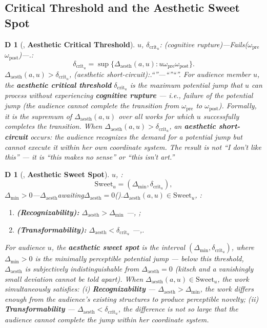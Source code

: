 \documentclass[12pt,a4paper]{article}
\newtheorem{definition}[theorem]Definition
\theoremstyle{remark}
\newcommand{\AesthDelta}{\Delta_{\text{aesth}}}
\newcommand{\CritDelta}{\delta_{\text{crit}}}
\begin{document}
\subsection{}
\subsection{Critical Threshold and the Aesthetic Sweet Spot}
\begin{definition}[, \textbf{Aesthetic Critical Threshold}]
\label{def:critical_threshold}
$u$,  $\CritDelta_u$: (cognitive rupture)---Fails($\omega_{\text{pre}}$$\omega_{\text{post}}$)---.: 
\begin{equation}\label{eq:critical_threshold}
 \CritDelta_u = \sup\{\AesthDelta(a, u) : \text{$u$$\omega_{\text{pre}}$$\omega_{\text{post}}$}\}.
\end{equation}
$\AesthDelta(a, u) > \CritDelta_u$, (aesthetic short-circuit):.``''---``''``''.
For audience member $u$, the \textbf{aesthetic critical threshold} $\CritDelta_u$ is the maximum potential jump that $u$ can process without experiencing \textbf{cognitive rupture} --- i.e., failure of the potential jump (the audience cannot complete the transition from $\omega_{\text{pre}}$ to $\omega_{\text{post}}$). Formally, it is the supremum of $\AesthDelta(a,u)$ over all works for which $u$ successfully completes the transition. When $\AesthDelta(a, u) > \CritDelta_u$, an \textbf{aesthetic short-circuit} occurs: the audience recognizes the demand for a potential jump but cannot execute it within her own coordinate system. The result is not ``I don't like this'' --- it is ``this makes no sense'' or ``this isn't art.''
\end{definition}
\begin{definition}[, \textbf{Aesthetic Sweet Spot}]
\label{def:sweet_spot}
$u$, : 
\begin{equation}\label{eq:sweet_spot}
 \text{Sweet}_u = (\Delta_{\text{min}}, \CritDelta_u),
\end{equation}
$\Delta_{\text{min}} > 0$---$\AesthDelta$awaiting$\AesthDelta = 0$().$\AesthDelta(a, u) \in \text{Sweet}_u$, : 
\begin{enumerate}[label=(i)]
 \item \textbf{ (Recognizability):} $\AesthDelta > \Delta_{\text{min}}$ ---, ; 
 \item \textbf{ (Transformability):} $\AesthDelta < \CritDelta_u$ ---,.
\end{enumerate}
For audience $u$, the \textbf{aesthetic sweet spot} is the interval $(\Delta_{\text{min}}, \CritDelta_u)$, where $\Delta_{\text{min}} > 0$ is the minimally perceptible potential jump --- below this threshold, $\AesthDelta$ is subjectively indistinguishable from $\AesthDelta = 0$ (kitsch and a vanishingly small deviation cannot be told apart). When $\AesthDelta(a, u) \in \text{Sweet}_u$, the work simultaneously satisfies: (i) \textbf{Recognizability} --- $\AesthDelta > \Delta_{\text{min}}$, the work differs enough from the audience's existing structures to produce perceptible novelty; (ii) \textbf{Transformability} --- $\AesthDelta < \CritDelta_u$, the difference is not so large that the audience cannot complete the jump within her coordinate system.
\end{definition}
\end{document}
